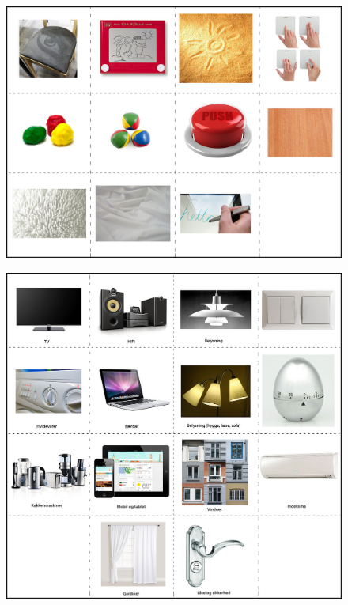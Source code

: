 \begin{figure}
\centering
\begin{minipage}[t]{.5\textwidth}
  \centering
  \includegraphics[width=0.9\linewidth]{workshops/technology-cards}
  \label{ch:workshops:technology-cards}
\end{minipage}%
\begin{minipage}[t]{.5\textwidth}
  \centering
  \includegraphics[width=0.9\linewidth]{workshops/appliance-cards}
  \label{ch:workshops:appliance-cards}
\end{minipage}
\end{figure}


